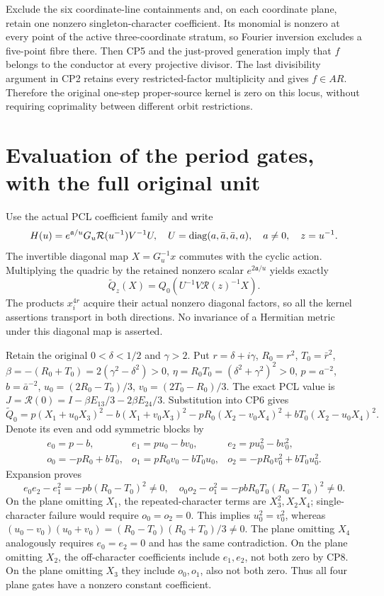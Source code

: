 Exclude the six coordinate-line containments and, on each coordinate
plane, retain one nonzero singleton-character coefficient. Its monomial
is nonzero at every point of the active three-coordinate stratum, so
Fourier inversion excludes a five-point fibre there. Then CP5 and the just-proved
generation imply that $f$ belongs to the conductor at every
projective divisor. The last divisibility argument in CP2 retains
every restricted-factor multiplicity and gives $f\in AR$. Therefore
the original one-step proper-source kernel is zero on this locus,
without requiring coprimality between different orbit restrictions.

\section{Evaluation of the period gates, with the full original unit}
Use the actual PCL coefficient family \cite{pcofactor:PCL} and write
\[
 H(u)=e^{\mathfrak a/u}G_u\mathcal R(u^{-1})V^{-1}U,
 \quad U=\operatorname{diag}(a,\bar a,\bar a,a),\quad a\ne0,\quad z=u^{-1}.
\]
The invertible diagonal map $X=G_u^{-1}x$ commutes with the cyclic
action. Multiplying the quadric by the retained nonzero scalar
$e^{2\mathfrak a/u}$ yields exactly
\[
 \widetilde Q_z(X)=Q_0(U^{-1}V\mathcal R(z)^{-1}X).                 \tag{CP6}
\]
The products $x_i^{4r}$ acquire their actual nonzero diagonal
factors, so all the kernel assertions transport in both directions.
No invariance of a Hermitian metric under this diagonal map is asserted.

Retain the original $0<\delta<1/2$ and $\gamma>2$.
Put $r=\delta+i\gamma$, $R_0=r^2$, $T_0=\bar r^2$,
$\beta=-(R_0+T_0)=2(\gamma^2-\delta^2)>0$,
$\eta=R_0T_0=(\delta^2+\gamma^2)^2>0$, $p=a^{-2}$,
$b=\bar a^{-2}$, $u_0=(2R_0-T_0)/3$, $v_0=(2T_0-R_0)/3$.
The exact PCL value is $J=\mathcal R(0)=I-\beta E_{13}/3-2\beta E_{24}/3$.
Substitution into CP6 gives
\[
 \widetilde Q_0=p(X_1+u_0X_3)^2-b(X_1+v_0X_3)^2
       -pR_0(X_2-v_0X_4)^2+bT_0(X_2-u_0X_4)^2.                    \tag{CP7}
\]
Denote its even and odd symmetric blocks by
\[
 \begin{array}{lll}
 e_0=p-b,&e_1=pu_0-bv_0,&e_2=pu_0^2-bv_0^2,\\
 o_0=-pR_0+bT_0,&o_1=pR_0v_0-bT_0u_0,
     &o_2=-pR_0v_0^2+bT_0u_0^2.
 \end{array}
\]
Expansion proves
\[
 e_0e_2-e_1^2=-pb(R_0-T_0)^2\ne0,\quad
 o_0o_2-o_1^2=-pbR_0T_0(R_0-T_0)^2\ne0.                           \tag{CP8}
\]
On the plane omitting $X_1$, the repeated-character terms are
$X_3^2,X_2X_4$; single-character failure would require $o_0=o_2=0$.
This implies $u_0^2=v_0^2$, whereas
$(u_0-v_0)(u_0+v_0)=(R_0-T_0)(R_0+T_0)/3\ne0$.
The plane omitting $X_4$ analogously requires $e_0=e_2=0$ and
has the same contradiction. On the plane omitting $X_2$, the
off-character coefficients include $e_1,e_2$, not both zero by
CP8. On the plane omitting $X_3$ they include $o_0,o_1$, also
not both zero. Thus all four plane gates have a nonzero constant
coefficient.

